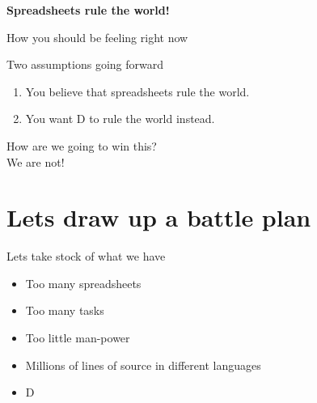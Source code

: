 \documentclass[aspectratio=169,notes]{beamer}
\begin{document}
	\begin{frame}{\mbox{}}
		\begin{center}
			\huge
			\textbf{Spreadsheets rule the world!}
		\end{center}
	\end{frame}
	
	\begin{frame}{How you should be feeling right now}
		\begin{center}
		\end{center}
	\end{frame}

	\begin{frame}{Two assumptions going forward}
		\huge
		\begin{enumerate}
			\item You believe that spreadsheets rule the world.
			\item You want D to rule the world instead.
		\end{enumerate}
	\end{frame}

	\begin{frame}{\mbox{}}
		\begin{center}
			\huge
			How are we going to win this?\\[2cm]
			\pause
			We are not!
		\end{center}
	\end{frame}

	\section{Lets draw up a battle plan}

	\begin{frame}{Lets take stock of what we have}
		\large
		\begin{itemize}
			\item Too many spreadsheets
			\item Too many tasks
			\item Too little man-power\\[1cm] \pause
			\item Millions of lines of source in different languages
			\item D
		\end{itemize}
	\end{frame}
\end{document}
